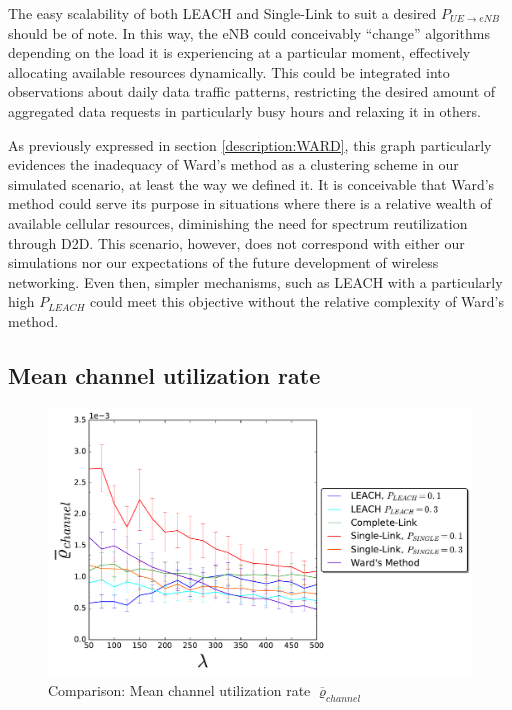 
The easy scalability of both LEACH and Single-Link to suit a desired $P_{UE\rightarrow eNB}$
should be of note. In this way, the eNB could conceivably ``change'' algorithms depending on the load it is experiencing at a particular moment, effectively allocating available resources dynamically. This could be integrated into observations about daily data traffic patterns, restricting the desired amount of aggregated data requests in particularly busy hours and relaxing it in others.

As previously expressed in section \ref{description:WARD}, this graph particularly evidences the inadequacy of Ward's method as a clustering scheme in our simulated scenario, at least the way we defined it. It is conceivable that Ward's method could serve its purpose in situations where there is a relative wealth of available cellular resources, diminishing the need for spectrum reutilization through D2D. This scenario, however, does not correspond with either our simulations nor our expectations of the future development of wireless networking. Even then, simpler mechanisms, such as LEACH with a particularly high $P_{LEACH}$ could meet this objective without the relative complexity of Ward's method.

\subsection{Mean channel utilization rate}

\begin{figure}[H]
\centering
\captionsetup{justification=centering}
\includegraphics[width=1\linewidth]{figures/COMPARE_8}
\caption{Comparison: Mean channel utilization rate $\overline{\varrho}_{channel}$}
\label{fig:COMPARE_8}
\end{figure}

